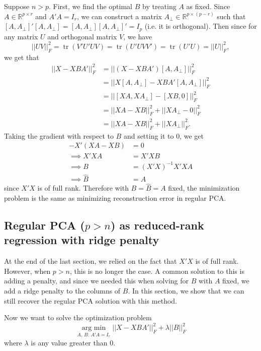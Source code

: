 \documentclass[11pt]{article}
\newcommand{\argmin}{\operatorname*{arg \ min}}
\newcommand{\tr}{\operatorname*{tr}}
\begin{document}
Suppose $n > p$. First, we find the optimal $B$ by treating $A$ as fixed. Since $A \in \mathbb{R}^{p \times r}$ and $A'A = I_r$, we can construct a matrix $A_{\bot} \in \mathbb{R}^{p \times (p - r)}$ such that $\left[A, A_{\bot}\right]'\left[A, A_{\bot}\right] = \left[A, A_{\bot}\right]\left[A, A_{\bot}\right]' = I_p$ (i.e. it is orthogonal). Then since for any matrix $U$ and orthogonal matrix $V$, we have 
$$
||UV||_F^2 = \tr(V'U'UV) = \tr(U'UVV') = \tr(U'U) = ||U||_F^2,
$$
we get that 
\begin{align*}
||X - XBA'||_F^2 &= ||(X - XBA')\left[A, A_{\bot}\right]||_F^2 \\
&= ||X\left[A, A_{\bot}\right] - XBA'\left[A, A_{\bot}\right]||_F^2 \\
&= ||\left[XA, XA_{\bot}\right] - \left[XB, 0\right]||_F^2 \\
&= ||XA - XB||_F^2 + ||XA_{\bot} - 0||_F^2\\
&= ||XA - XB||_F^2 + ||XA_{\bot}||_F^2.
\end{align*}
Taking the gradient with respect to $B$ and setting it to $0$, we get
\begin{align*}
-X'(XA - XB) &= 0 \\
\implies X'XA &= X'XB \\
\implies B &= (X'X)^{-1}X'XA \\
\implies \hat{B} &= A
\end{align*}
since $X'X$ is of full rank. Therefore with $B = \hat{B} = A$ fixed, the minimization problem is the same as minimizing reconstruction error in regular PCA.

\subsection{Regular PCA ($p > n$) as reduced-rank regression with ridge penalty}
At the end of the last section, we relied on the fact that $X'X$ is of full rank. However, when $p > n$, this is no longer the case. A common solution to this is adding a penalty, and since we needed this when solving for $B$ with $A$ fixed, we add a ridge penalty to the columns of $B$. In this section, we show that we can still recover the regular PCA solution with this method.

Now we want to solve the optimization problem 
\begin{equation*}
\argmin_{A, \,B: \,A'A = I_r} ||X - XBA'||_F^2 + \lambda||B||_F^2
\end{equation*}
where $\lambda$ is any value greater than $0$. 
\end{document}
